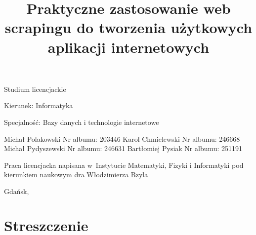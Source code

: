 \documentclass[12pt,a4paper,oneside,openany,parskip=full,parindent=full]{book}
\begin{document}
\begin{center}

\vspace{1cm}

Studium licencjackie
\end{center}

\vspace{1cm}

\noindent Kierunek: Informatyka

\noindent Specjalność: Bazy danych i technologie internetowe

\vspace{1cm}

{
\leftskip=10cm\noindent
Michał Polakowski\newline
Nr albumu: 203446\newline
Karol Chmielewski\newline
Nr albumu: 246668\newline
Michał Pydyszewski\newline
Nr albumu: 246631\newline
Bartłomiej Pysiak\newline
Nr albumu: 251191
}

\vspace{2cm}

\title{Praktyczne zastosowanie web scrapingu do tworzenia użytkowych aplikacji internetowych}
\makeatletter

\begin{center}
\LARGE\bf
\@title
\end{center}

\vspace{2cm}

{
\leftskip=10cm\noindent
Praca licencjacka\newline 
napisana w~Instytucie Matematyki, Fizyki i Informatyki\newline
pod kierunkiem naukowym\newline
dra Włodzimierza Bzyla

}

\vfill

\begin{center}
Gdańsk, \the\year
\end{center}
\thispagestyle{empty}

\clearpage
\thispagestyle{empty}
\clearpage

\tableofcontents

\clearpage
\chapter*{Streszczenie}














\clearpage
\end{document}
